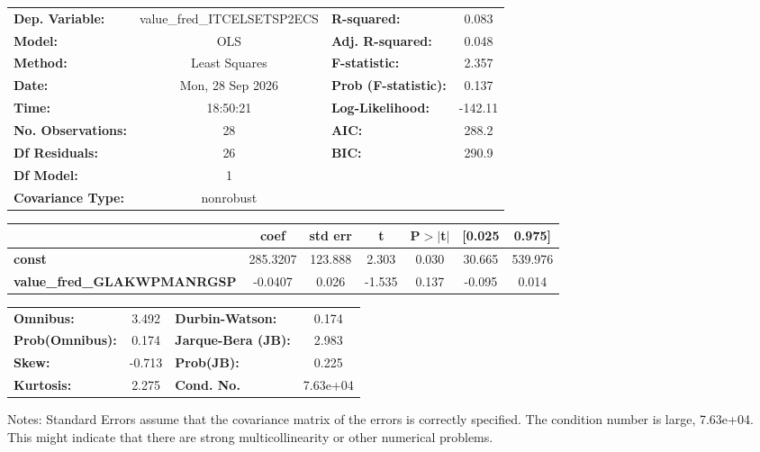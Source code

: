 \begin{center}
\begin{tabular}{lclc}
\toprule
\textbf{Dep. Variable:}             & value\_fred\_ITCELSETSP2ECS & \textbf{  R-squared:         } &     0.083   \\
\textbf{Model:}                     &             OLS             & \textbf{  Adj. R-squared:    } &     0.048   \\
\textbf{Method:}                    &        Least Squares        & \textbf{  F-statistic:       } &     2.357   \\
\textbf{Date:}                      &       Mon, 28 Sep 2026      & \textbf{  Prob (F-statistic):} &    0.137    \\
\textbf{Time:}                      &           18:50:21          & \textbf{  Log-Likelihood:    } &   -142.11   \\
\textbf{No. Observations:}          &                28           & \textbf{  AIC:               } &     288.2   \\
\textbf{Df Residuals:}              &                26           & \textbf{  BIC:               } &     290.9   \\
\textbf{Df Model:}                  &                 1           & \textbf{                     } &             \\
\textbf{Covariance Type:}           &          nonrobust          & \textbf{                     } &             \\
\bottomrule
\end{tabular}
\begin{tabular}{lcccccc}
                                    & \textbf{coef} & \textbf{std err} & \textbf{t} & \textbf{P$> |$t$|$} & \textbf{[0.025} & \textbf{0.975]}  \\
\midrule
\textbf{const}                      &     285.3207  &      123.888     &     2.303  &         0.030        &       30.665    &      539.976     \\
\textbf{value\_fred\_GLAKWPMANRGSP} &      -0.0407  &        0.026     &    -1.535  &         0.137        &       -0.095    &        0.014     \\
\bottomrule
\end{tabular}
\begin{tabular}{lclc}
\textbf{Omnibus:}       &  3.492 & \textbf{  Durbin-Watson:     } &    0.174  \\
\textbf{Prob(Omnibus):} &  0.174 & \textbf{  Jarque-Bera (JB):  } &    2.983  \\
\textbf{Skew:}          & -0.713 & \textbf{  Prob(JB):          } &    0.225  \\
\textbf{Kurtosis:}      &  2.275 & \textbf{  Cond. No.          } & 7.63e+04  \\
\bottomrule
\end{tabular}
\end{center}

Notes: \newline
 [1] Standard Errors assume that the covariance matrix of the errors is correctly specified. \newline
 [2] The condition number is large, 7.63e+04. This might indicate that there are \newline
 strong multicollinearity or other numerical problems.